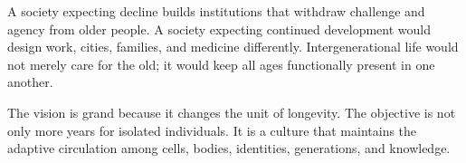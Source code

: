 A society expecting decline builds institutions that withdraw challenge and agency from older people. A society expecting continued development would design work, cities, families, and medicine differently. Intergenerational life would not merely care for the old; it would keep all ages functionally present in one another.

The vision is grand because it changes the unit of longevity. The objective is not only more years for isolated individuals. It is a culture that maintains the adaptive circulation among cells, bodies, identities, generations, and knowledge.
